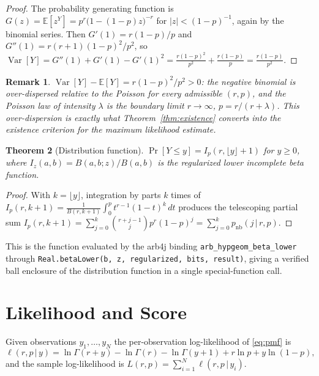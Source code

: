 \documentclass[11pt]{article}
\newtheorem{theorem}{Theorem}[section]
\newtheorem{remark}[theorem]{Remark}
\begin{document}
\begin{proof}
The probability generating function is
$G(z)=\mathbb{E}[z^{Y}]=p^{r}\bigl(1-(1-p)z\bigr)^{-r}$ for
$|z|<(1-p)^{-1}$, again by the binomial series. Then
$G'(1)=r(1-p)/p$ and
$G''(1)=r(r+1)(1-p)^{2}/p^{2}$, so
$\operatorname{Var}[Y]=G''(1)+G'(1)-G'(1)^{2}
=\frac{r(1-p)^{2}}{p^{2}}+\frac{r(1-p)}{p}
=\frac{r(1-p)}{p^{2}}$.
\end{proof}

\begin{remark}
$\operatorname{Var}[Y]-\mathbb{E}[Y]=r(1-p)^{2}/p^{2}>0$: the negative
binomial is over-dispersed relative to the Poisson for every admissible
$(r,p)$, and the Poisson law of intensity $\lambda$ is the boundary limit
$r\to\infty$, $p=r/(r+\lambda)$. This over-dispersion is exactly what
Theorem~\ref{thm:existence} converts into the existence criterion for the
maximum likelihood estimate.
\end{remark}

\begin{theorem}[Distribution function]\label{thm:cdf}
$\displaystyle
\Pr[Y\le y]=I_{p}(r,\lfloor y\rfloor+1)$
for $y\ge0$, where
$I_{z}(a,b)=B(a,b;z)/B(a,b)$ is the regularized lower incomplete beta
function.
\end{theorem}

\begin{proof}
With $k=\lfloor y\rfloor$, integration by parts $k$ times of
$I_{p}(r,k+1)=\frac{1}{B(r,k+1)}\int_{0}^{p}t^{r-1}(1-t)^{k}\,dt$
produces the telescoping partial sum
$I_{p}(r,k+1)=\sum_{j=0}^{k}\binom{r+j-1}{j}p^{r}(1-p)^{j}
=\sum_{j=0}^{k}p_{\mathrm{nb}}(j\,|\,r,p)$.
\end{proof}

This is the function evaluated by the arb4j binding
\texttt{arb\_hypgeom\_beta\_lower} through
\texttt{Real.betaLower(b, z, regularized, bits, result)}, giving a verified
ball enclosure of the distribution function in a single special-function
call.

\section{Likelihood and Score}

Given observations $y_{1},\ldots,y_{N}$ the per-observation log-likelihood
of \eqref{eq:pmf} is
\begin{equation}
\ell(r,p\,|\,y)=\ln\Gamma(r+y)-\ln\Gamma(r)-\ln\Gamma(y+1)+r\ln p+y\ln(1-p),
\label{eq:loglik}
\end{equation}
and the sample log-likelihood is
$L(r,p)=\sum_{i=1}^{N}\ell(r,p\,|\,y_{i})$.
\end{document}
